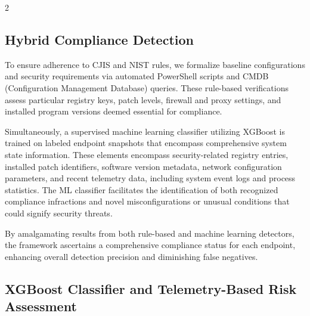 \documentclass[10pt]{article} %
\begin{document}
\begin{multicols}{2}
\subsection{Hybrid Compliance Detection}

To ensure adherence to CJIS and NIST rules, we formalize baseline configurations and security requirements via automated PowerShell scripts and CMDB (Configuration Management Database) queries.  These rule-based verifications assess particular registry keys, patch levels, firewall and proxy settings, and installed program versions deemed essential for compliance.

 Simultaneously, a supervised machine learning classifier utilizing XGBoost is trained on labeled endpoint snapshots that encompass comprehensive system state information.  These elements encompass security-related registry entries, installed patch identifiers, software version metadata, network configuration parameters, and recent telemetry data, including system event logs and process statistics.  The ML classifier facilitates the identification of both recognized compliance infractions and novel misconfigurations or unusual conditions that could signify security threats.

 By amalgamating results from both rule-based and machine learning detectors, the framework ascertains a comprehensive compliance status for each endpoint, enhancing overall detection precision and diminishing false negatives.

\subsection{XGBoost Classifier and Telemetry-Based Risk Assessment}


\end{multicols}
\end{document}
